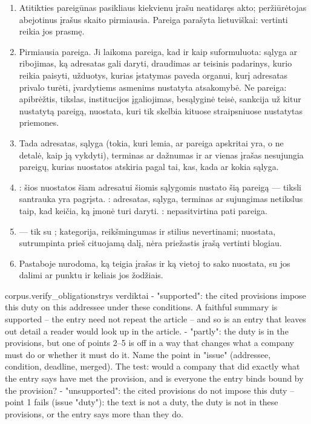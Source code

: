 \begin{enumerate}[itemsep=1pt, topsep=3pt]
  \item Atitikties pareigūnas pasikliaus kiekvienu įrašu neatidaręs akto; peržiūrėtojas
    abejotinus įrašus skaito pirmiausia. Pareiga parašyta lietuviškai: vertinti reikia jos
    prasmę.
  \item Pirmiausia pareiga. Ji laikoma pareiga, kad ir kaip suformuluota: sąlyga ar ribojimas,
    ką adresatas gali daryti, draudimas ar teisinis padarinys, kurio reikia paisyti, užduotys,
    kurias įstatymas paveda organui, kurį adresatas privalo turėti, įvardytiems asmenims
    nustatyta atsakomybė. Ne pareiga: apibrėžtis, tikslas, institucijos įgaliojimas, besąlyginė
    teisė, sankcija už kitur nustatytą pareigą, nuostata, kuri tik skelbia kituose straipsniuose
    nustatytas priemones.
  \item Tada adresatas, sąlyga (tokia, kuri lemia, ar pareiga apskritai yra, o ne detalė, kaip
    ją vykdyti), terminas ar dažnumas ir ar vienas įrašas nesujungia pareigų, kurias nuostatos
    atskiria pagal tai, kas, kada ar kokia sąlyga.
  \item {}: šios nuostatos šiam adresatui šiomis sąlygomis nustato šią pareigą ---
    tiksli santrauka yra pagrįsta. : adresatas, sąlyga, terminas ar sujungimas
    netikslus taip, kad keičia, ką įmonė turi daryti. : nepasitvirtina pati
    pareiga.
  \item {} --- tik su ; kategorija, reikšmingumas ir stilius
    nevertinami; nuostata, sutrumpinta prieš cituojamą dalį, nėra priežastis įrašą vertinti
    blogiau.
  \item Pastaboje nurodoma, ką teigia įrašas ir ką vietoj to sako nuostata, su jos dalimi ar
    punktu ir keliais jos žodžiais.
\end{enumerate}

\par\nopagebreak
\begin{promptexcerpt}{corpus.verify_obligations}{trys verdiktai}
- "supported": the cited provisions impose this duty on this addressee under these conditions. A faithful summary is supported – the entry need not repeat the article – and so is an entry that leaves out detail a reader would look up in the article.
- "partly": the duty is in the provisions, but one of points 2–5 is off in a way that changes what a company must do or whether it must do it. Name the point in "issue" (addressee, condition, deadline, merged). The test: would a company that did exactly what the entry says have met the provision, and is everyone the entry binds bound by the provision?
- "unsupported": the cited provisions do not impose this duty – point 1 fails (issue "duty"): the text is not a duty, the duty is not in these provisions, or the entry says more than they do.
\end{promptexcerpt}

